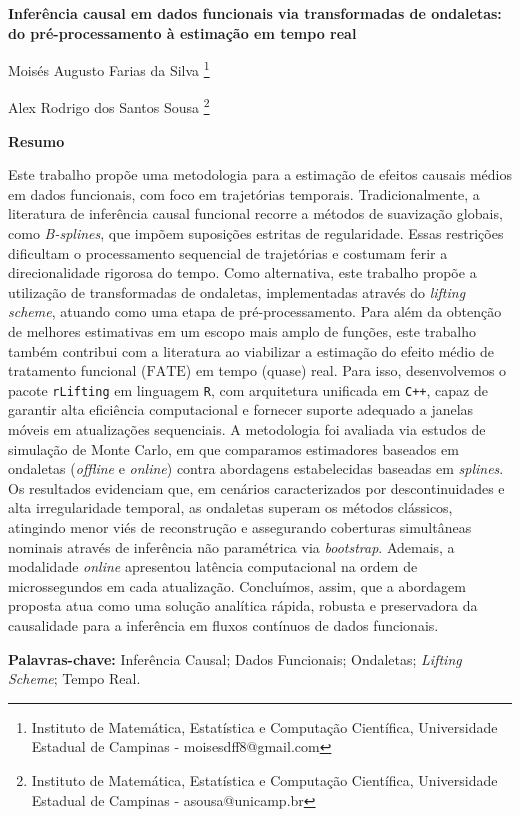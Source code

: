 \documentclass[a4paper,11pt]{article}
\begin{document}
\begin{center}
\Large{\textbf{Inferência causal em dados funcionais via transformadas de ondaletas: do pré-processamento à estimação em tempo real}}
\end{center}

\begin{center}
    Moisés Augusto Farias da Silva
    \footnote[1]{Instituto de Matemática, Estatística e Computação Científica, Universidade Estadual de Campinas - moisesdff8@gmail.com}

    Alex Rodrigo dos Santos Sousa
    \footnote[2]{Instituto de Matemática, Estatística e Computação Científica, Universidade Estadual de Campinas - asousa@unicamp.br}

    \vspace{0.5cm}
    \large{\textbf{Resumo}}
\end{center}

Este trabalho propõe uma metodologia para a estimação de efeitos causais médios em dados funcionais, com foco em trajetórias temporais. Tradicionalmente, a literatura de inferência causal funcional recorre a métodos de suavização globais, como \emph{B-splines}, que impõem suposições estritas de regularidade. Essas restrições dificultam o processamento sequencial de trajetórias e costumam ferir a direcionalidade rigorosa do tempo. Como alternativa, este trabalho propõe a utilização de transformadas de ondaletas, implementadas através do \emph{lifting scheme}, atuando como uma etapa de pré-processamento. Para além da obtenção de melhores estimativas em um escopo mais amplo de funções, este trabalho também contribui com a literatura ao viabilizar a estimação do efeito médio de tratamento funcional (\(\mathrm{FATE}\)) em tempo (quase) real. Para isso, desenvolvemos o pacote \texttt{rLifting} em linguagem \texttt{R}, com arquitetura unificada em \texttt{C++}, capaz de garantir alta eficiência computacional e fornecer suporte adequado a janelas móveis em atualizações sequenciais. A metodologia foi avaliada via estudos de simulação de Monte Carlo, em que comparamos estimadores baseados em ondaletas (\emph{offline} e \emph{online}) contra abordagens estabelecidas baseadas em \emph{splines}. Os resultados evidenciam que, em cenários caracterizados por descontinuidades e alta irregularidade temporal, as ondaletas superam os métodos clássicos, atingindo menor viés de reconstrução e assegurando coberturas simultâneas nominais através de inferência não paramétrica via \emph{bootstrap}. Ademais, a modalidade \emph{online} apresentou latência computacional na ordem de microssegundos em cada atualização. Concluímos, assim, que a abordagem proposta atua como uma solução analítica rápida, robusta e preservadora da causalidade para a inferência em fluxos contínuos de dados funcionais.

\vspace{0.5cm}
\textbf{Palavras-chave:} Inferência Causal; Dados Funcionais; Ondaletas; \textit{Lifting Scheme}; Tempo Real.
\end{document}
